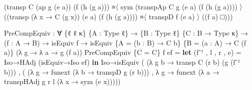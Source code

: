 \documentclass[
  11pt,
  oneside,
  article]{memoir}
\newenvironment{Shaded}{}{}
\newcommand{\KeywordTok}[1]{\textcolor[rgb]{0.00,0.44,0.13}{\textbf{#1}}}
\newcommand{\NormalTok}[1]{#1}
\newcommand{\OtherTok}[1]{\textcolor[rgb]{0.00,0.44,0.13}{#1}}
\theoremstyle{definition}
\theoremstyle{plain}
\newcommand{\0}{\textsf{0}}
\newcommand{\1}{\tn{\textsf{1}}}
\begin{document}
\begin{Shaded}
\begin{Highlighting}[]
    \OtherTok{(}\NormalTok{transp C }\OtherTok{(}\NormalTok{ap g }\OtherTok{(}\NormalTok{e\textquotesingle{} a}\OtherTok{))} \OtherTok{(}\NormalTok{f }\OtherTok{(}\NormalTok{h }\OtherTok{(}\NormalTok{g a}\OtherTok{)))} 
\NormalTok{        ≡〈 sym }\OtherTok{(}\NormalTok{transpAp C g }\OtherTok{(}\NormalTok{e\textquotesingle{} a}\OtherTok{)} \OtherTok{(}\NormalTok{f }\OtherTok{(}\NormalTok{h }\OtherTok{(}\NormalTok{g a}\OtherTok{))))}\NormalTok{ 〉 }
    \OtherTok{((}\NormalTok{transp }\OtherTok{(λ}\NormalTok{ x }\OtherTok{→}\NormalTok{ C }\OtherTok{(}\NormalTok{g x}\OtherTok{))} \OtherTok{(}\NormalTok{e\textquotesingle{} a}\OtherTok{)} \OtherTok{(}\NormalTok{f }\OtherTok{(}\NormalTok{h }\OtherTok{(}\NormalTok{g a}\OtherTok{))))} 
\NormalTok{        ≡〈 transpD f }\OtherTok{(}\NormalTok{e\textquotesingle{} a}\OtherTok{)}\NormalTok{ 〉}
    \OtherTok{((}\NormalTok{f a}\OtherTok{)}\NormalTok{ □}\OtherTok{)))}

\NormalTok{PreCompEquiv }\OtherTok{:} \OtherTok{∀} \OtherTok{\{}\NormalTok{ℓ ℓ\textquotesingle{} κ}\OtherTok{\}} \OtherTok{\{}\NormalTok{A }\OtherTok{:}\NormalTok{ Type ℓ}\OtherTok{\}} 
               \OtherTok{→} \OtherTok{\{}\NormalTok{B }\OtherTok{:}\NormalTok{ Type ℓ\textquotesingle{}}\OtherTok{\}} \OtherTok{\{}\NormalTok{C }\OtherTok{:}\NormalTok{ B }\OtherTok{→}\NormalTok{ Type κ}\OtherTok{\}}
               \OtherTok{→} \OtherTok{(}\NormalTok{f }\OtherTok{:}\NormalTok{ A }\OtherTok{→}\NormalTok{ B}\OtherTok{)} \OtherTok{→}\NormalTok{ isEquiv f }
               \OtherTok{→}\NormalTok{ isEquiv }\OtherTok{\{}\NormalTok{A }\OtherTok{=} \OtherTok{(}\NormalTok{b }\OtherTok{:}\NormalTok{ B}\OtherTok{)} \OtherTok{→}\NormalTok{ C b}\OtherTok{\}} 
                         \OtherTok{\{}\NormalTok{B }\OtherTok{=} \OtherTok{(}\NormalTok{a }\OtherTok{:}\NormalTok{ A}\OtherTok{)} \OtherTok{→}\NormalTok{ C }\OtherTok{(}\NormalTok{f a}\OtherTok{)\}} 
                         \OtherTok{(λ}\NormalTok{ g }\OtherTok{→} \OtherTok{λ}\NormalTok{ a }\OtherTok{→}\NormalTok{ g }\OtherTok{(}\NormalTok{f a}\OtherTok{))}
\NormalTok{PreCompEquiv }\OtherTok{\{}\NormalTok{C }\OtherTok{=}\NormalTok{ C}\OtherTok{\}}\NormalTok{ f ef }\OtherTok{=}
    \KeywordTok{let} \OtherTok{(}\NormalTok{f⁻¹ , l , r , e}\OtherTok{)} \OtherTok{=}\NormalTok{ Iso→HAdj }\OtherTok{(}\NormalTok{isEquiv→Iso ef}\OtherTok{)} 
    \KeywordTok{in}\NormalTok{ Iso→isEquiv }\OtherTok{(} \OtherTok{(λ}\NormalTok{ g b }\OtherTok{→}\NormalTok{ transp C }\OtherTok{(}\NormalTok{r b}\OtherTok{)} \OtherTok{(}\NormalTok{g }\OtherTok{(}\NormalTok{f⁻¹ b}\OtherTok{)))} 
\NormalTok{                   , }\OtherTok{(} \OtherTok{(λ}\NormalTok{ g }\OtherTok{→}\NormalTok{ funext }\OtherTok{(λ}\NormalTok{ b }\OtherTok{→}\NormalTok{ transpD g }\OtherTok{(}\NormalTok{r b}\OtherTok{)))} 
\NormalTok{                     , }\OtherTok{λ}\NormalTok{ g }\OtherTok{→}\NormalTok{ funext }\OtherTok{(λ}\NormalTok{ a }\OtherTok{→}\NormalTok{ transpHAdj g r l }
                                             \OtherTok{(λ}\NormalTok{ x }\OtherTok{→}\NormalTok{ sym }\OtherTok{(}\NormalTok{e x}\OtherTok{)))))}


\end{Highlighting}
\end{Shaded}
\end{document}
